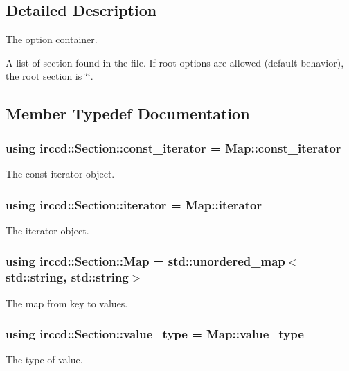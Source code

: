 \subsection{Detailed Description}
The option container. 

A list of section found in the file. If root options are allowed (default behavior), the root section is \char`\"{}\char`\"{}. 

\subsection{Member Typedef Documentation}
\hypertarget{a00054_a3199836dc245a8bd94aeaab5ba11dd1d}{
\subsubsection[{const\-\_\-iterator}]{\setlength{\rightskip}{0pt plus 5cm}using {\bf irccd\-::\-Section\-::const\-\_\-iterator} =  Map\-::const\-\_\-iterator}}\label{a00054_a3199836dc245a8bd94aeaab5ba11dd1d}
The const iterator object. \hypertarget{a00054_a3ae2d0c993b178753a34ccd3970e0e9f}{
\subsubsection[{iterator}]{\setlength{\rightskip}{0pt plus 5cm}using {\bf irccd\-::\-Section\-::iterator} =  Map\-::iterator}}\label{a00054_a3ae2d0c993b178753a34ccd3970e0e9f}
The iterator object. \hypertarget{a00054_a3f77be6ee20c34fda18e7db4c469bd82}{
\subsubsection[{Map}]{\setlength{\rightskip}{0pt plus 5cm}using {\bf irccd\-::\-Section\-::\-Map} =  std\-::unordered\-\_\-map$<$std\-::string, std\-::string$>$}}\label{a00054_a3f77be6ee20c34fda18e7db4c469bd82}
The map from key to values. \hypertarget{a00054_a020828c80a755d59714cf700be3e842d}{
\subsubsection[{value\-\_\-type}]{\setlength{\rightskip}{0pt plus 5cm}using {\bf irccd\-::\-Section\-::value\-\_\-type} =  Map\-::value\-\_\-type}}\label{a00054_a020828c80a755d59714cf700be3e842d}
The type of value. 


